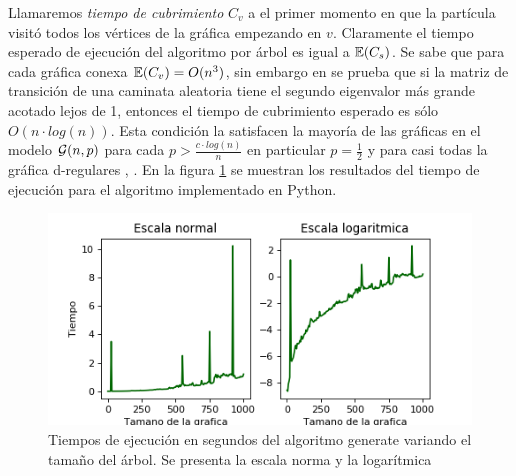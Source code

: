 Llamaremos \textit{tiempo de cubrimiento} $C_{v}$ a el primer momento en que la partícula visitó todos los vértices de la gráfica empezando en $v$. Claramente el tiempo esperado de ejecución del algoritmo por árbol es igual a $\mathbb{E}(C_{s})$. Se sabe que para cada gráfica conexa $\mathbb{E}(C_{v}) = O(n^{3})$, sin embargo en \cite{BS89} se prueba que si la matriz de transición de una caminata aleatoria tiene el segundo eigenvalor más grande acotado lejos de 1, entonces el tiempo de cubrimiento esperado es sólo $O(n\cdot log(n))$. Esta condición la satisfacen la mayoría de las gráficas en el modelo $\mathcal{G}(n,p)$ para cada $p > \frac{c\cdot log(n)}{n}$ en particular $p=\frac{1}{2}$ y para casi todas la gráfica d-regulares \cite{BS87}, \cite{FKS89}. En la figura \ref{fig:tiemposGEN} se muestran los resultados del tiempo de ejecución para el algoritmo implementado en Python.

\begin{figure}[h!]
	\centering
	\includegraphics[scale=0.8]{Python/Figures/Time-generate.png}
	\caption{Tiempos de ejecución en segundos del algoritmo generate variando el tamaño del árbol. Se presenta la escala norma y la logarítmica}
	\label{fig:tiemposGEN}
\end{figure}
